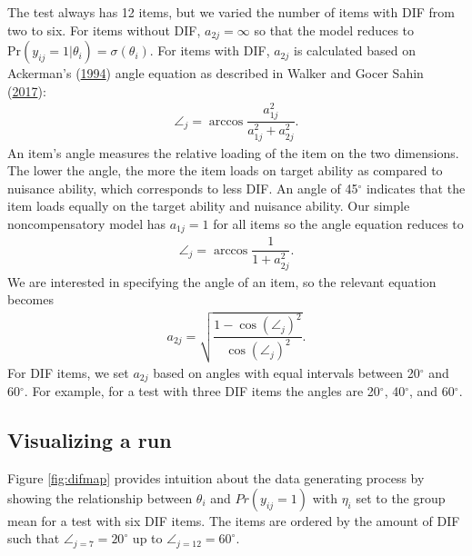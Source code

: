 \documentclass[
  11pt,
]{article}
\begin{document}
The test always has 12 items, but we varied the number of items with DIF from two to six. For items without DIF, \(a_{2j} = \infty\) so that the model reduces to \(\text{Pr}(y_{ij} = 1 | \theta_i) = \sigma(\theta_i)\). For items with DIF, \(a_{2j}\) is calculated based on Ackerman's (\protect\hyperlink{ref-ackerman1994using}{1994}) angle equation as described in Walker and Gocer Sahin (\protect\hyperlink{ref-walker2017using}{2017}):
\begin{align}
\angle_j = \arccos \dfrac{a_{1j}^2}{a_{1j}^2 + a_{2j}^2}.
\end{align}
An item's angle measures the relative loading of the item on the two dimensions. The lower the angle, the more the item loads on target ability as compared to nuisance ability, which corresponds to less DIF. An angle of 45\(^\circ\) indicates that the item loads equally on the target ability and nuisance ability. Our simple noncompensatory model has \(a_{1j} = 1\) for all items so the angle equation reduces to
\begin{align}
\angle_j = \arccos \dfrac{1}{1 + a_{2j}^2}.
\end{align}
We are interested in specifying the angle of an item, so the relevant equation becomes
\begin{align}
a_{2j} = \sqrt{\dfrac{1 - \cos(\angle_j)^2}{\cos(\angle_j)^2}}.
\end{align}
For DIF items, we set \(a_{2j}\) based on angles with equal intervals between 20\(^\circ\) and 60\(^\circ\). For example, for a test with three DIF items the angles are 20\(^\circ\), 40\(^\circ\), and 60\(^\circ\).

\hypertarget{visualizing-a-run}{%
\subsection{Visualizing a run}\label{visualizing-a-run}}

Figure \ref{fig:difmap} provides intuition about the data generating process by showing the relationship between \(\theta_i\) and \(Pr(y_{ij} = 1)\) with \(\eta_i\) set to the group mean for a test with six DIF items. The items are ordered by the amount of DIF such that \(\angle_{j = 7} = 20^\circ\) up to \(\angle_{j = 12} = 60^\circ\).
\end{document}
